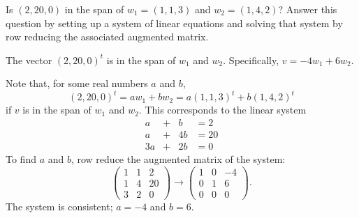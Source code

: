 \documentclass{ximera}
\begin{document}
\begin{exercise} \label{c5.2.5}
Is $(2,20,0)$ in the span of $w_1=(1,1,3)$ and $w_2=(1,4,2)$?
Answer this question by setting up a system of linear equations
and solving that system by row reducing the associated augmented
matrix.

\begin{solution}

\ans The vector $(2,20,0)^t$ is in the span of $w_1$ and $w_2$. 
Specifically, $v = -4w_1 + 6w_2$.

\soln Note that, for some real numbers $a$ and $b$,
\[
(2,20,0)^t = aw_1 + bw_2 = a(1,1,3)^t + b(1,4,2)^t
\]
if $v$ is in the span of $w_1$ and $w_2$.
This corresponds to the linear system
\[
\begin{array}{rrrrr}
a & + & b & = 2 \\
a & + & 4b & = 20 \\
3a & + & 2b & = 0 \end{array}
\]
To find $a$ and $b$, row reduce the augmented matrix of the system:
\[
\left(\begin{array}{rr|r} 1 & 1 & 2 \\ 1 & 4 & 20 \\
3 & 2 & 0 \end{array}\right) \longrightarrow
\left(\begin{array}{rr|r} 1 & 0 & -4 \\ 0 & 1 & 6 \\
0 & 0 & 0 \end{array}\right).
\]
The system is consistent; $a = -4$ and $b = 6$.

\end{solution}
\end{exercise}
\end{document}
